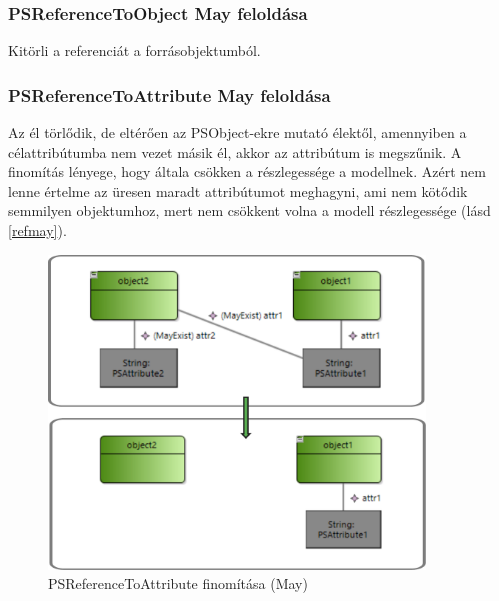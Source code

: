 \subsubsection{PSReferenceToObject May feloldása}
Kitörli a referenciát a forrásobjektumból.

\subsubsection{PSReferenceToAttribute May feloldása}
Az él törlődik, de eltérően az PSObject-ekre mutató élektől, amennyiben a célattribútumba nem vezet másik él, akkor az attribútum is megszűnik. A finomítás lényege, hogy általa csökken a részlegessége a modellnek. Azért nem lenne értelme az üresen maradt attribútumot meghagyni, ami nem kötődik semmilyen objektumhoz, mert nem csökkent volna a modell részlegessége (lásd \autoref{refmay}).
\begin{figure}[!ht]
	\centering
	\includegraphics[width=100mm]{figures/refmay.pdf}
	\caption{PSReferenceToAttribute finomítása (May)}
	\label{refmay} 
\end{figure}

